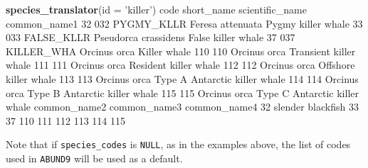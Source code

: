 \documentclass[
]{book}
\newenvironment{Shaded}{\begin{snugshade}}{\end{snugshade}}
\newcommand{\DataTypeTok}[1]{\textcolor[rgb]{0.13,0.29,0.53}{#1}}
\newcommand{\DecValTok}[1]{\textcolor[rgb]{0.00,0.00,0.81}{#1}}
\newcommand{\KeywordTok}[1]{\textcolor[rgb]{0.13,0.29,0.53}{\textbf{#1}}}
\newcommand{\NormalTok}[1]{#1}
\newcommand{\StringTok}[1]{\textcolor[rgb]{0.31,0.60,0.02}{#1}}
\begin{document}
\begin{Shaded}
\begin{Highlighting}[]
\KeywordTok{species_translator}\NormalTok{(}\DataTypeTok{id =} \StringTok{'killer'}\NormalTok{)}
\NormalTok{    code short_name      scientific_name                  common_name1}
\DecValTok{32}   \DecValTok{032}\NormalTok{ PYGMY_KLLR     Feresa attenuata            Pygmy killer whale}
\DecValTok{33}   \DecValTok{033}\NormalTok{ FALSE_KLLR Pseudorca crassidens            False killer whale}
\DecValTok{37}   \DecValTok{037}\NormalTok{ KILLER_WHA         Orcinus orca                  Killer whale}
\DecValTok{110}  \DecValTok{110}\NormalTok{                    Orcinus orca        Transient killer whale}
\DecValTok{111}  \DecValTok{111}\NormalTok{                    Orcinus orca         Resident killer whale}
\DecValTok{112}  \DecValTok{112}\NormalTok{                    Orcinus orca         Offshore killer whale}
\DecValTok{113}  \DecValTok{113}\NormalTok{                    Orcinus orca Type A Antarctic killer whale}
\DecValTok{114}  \DecValTok{114}\NormalTok{                    Orcinus orca Type B Antarctic killer whale}
\DecValTok{115}  \DecValTok{115}\NormalTok{                    Orcinus orca Type C Antarctic killer whale}
\NormalTok{         common_name2 common_name3 common_name4}
\DecValTok{32}\NormalTok{  slender blackfish                          }
\DecValTok{33}                                             
\DecValTok{37}                                             
\DecValTok{110}                                            
\DecValTok{111}                                            
\DecValTok{112}                                            
\DecValTok{113}                                            
\DecValTok{114}                                            
\DecValTok{115}                                            
\end{Highlighting}
\end{Shaded}

Note that if \texttt{species\_codes} is \texttt{NULL}, as in the examples above, the list of codes used in \texttt{ABUND9} will be used as a default.

  
\end{document}
